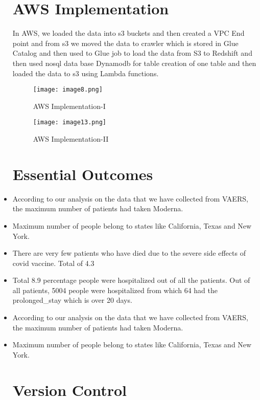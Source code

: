 \documentclass[conference]{IEEEtran}
\begin{document}
\begin{itemize}
\section{AWS Implementation}
In AWS, we loaded the data into s3 buckets and then created a VPC End point and from s3 we moved the data to crawler which is stored in Glue Catalog and then used to Glue job to load the data from S3 to Redshift and then used nosql data base Dynamodb  for table creation of one table and then loaded the data to s3 using Lambda functions.

\begin{figure}[htp]
    \centering
    \texttt{[image: image8.png]}
    \caption{AWS Implementation-I}
    \label{fig:galaxy}
\end{figure}

\begin{figure}[htp]
    \centering
    \texttt{[image: image13.png]}
    \caption{AWS Implementation-II}
    \label{fig:galaxy}
\end{figure}

\section{Essential Outcomes}
\item According to our analysis on the data that we have collected from VAERS, the maximum number of patients had taken Moderna. 
\item Maximum number of people belong to states like California, Texas and New York.
\item There are very few patients who have died due to the severe side effects of covid vaccine. Total of 4.3 %
\item Total 8.9 percentage  people were hospitalized out of all the patients.
Out of all patients, 5004 people were hospitalized from which 64 had the prolonged\_stay which is over 20 days.


\item According to our analysis on the data that we have collected from VAERS, the maximum number of patients had taken Moderna. 
\item Maximum number of people belong to states like California, Texas and New York.

\section{Version Control}


\end{itemize}
\end{document}
